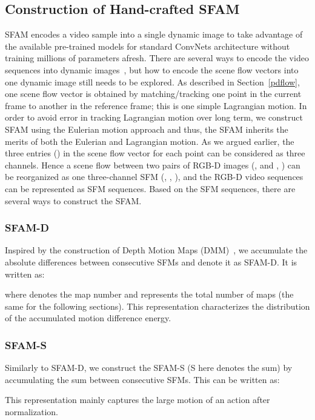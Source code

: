 \documentclass[10pt,twocolumn,letterpaper]{article}
\begin{document}
\subsection{Construction of Hand-crafted SFAM }\label{sfam}
SFAM encodes a video sample into a single dynamic image to 
take advantage of the available pre-trained models for standard ConvNets 
architecture without training millions of parameters afresh. There are several 
ways to encode the video sequences into dynamic 
images~\cite{bobick2001recognition,
man2006individual,
Yang2012a,pichao2015,pichaoTHMS,bilen2016dynamic}, but how to encode 
the scene flow vectors into one dynamic image still needs to be explored. As 
described in Section~\ref{pdflow}, one scene flow vector  is obtained by matching/tracking one point in the 
current frame to another in the reference frame; this is one simple Lagrangian 
motion. In order to avoid error in tracking Lagrangian motion over long term, 
we construct SFAM using the Eulerian motion approach and thus, the SFAM 
inherits the merits of both the Eulerian and Lagrangian motion. As we argued 
earlier, the three entries () in the scene flow vector 
 for each point can be considered as three channels. Hence a
scene flow between two pairs of RGB-D images (,  and , 
) can be reorganized as one three-channel SFM (, 
, ), and the RGB-D video sequences can be represented 
as SFM sequences. Based on the SFM sequences, there are several ways to 
construct the SFAM. 

\subsubsection{SFAM-D}
Inspired by the construction of Depth Motion Maps (DMM)~\cite{Yang2012a}, 
we accumulate the absolute differences between consecutive SFMs and denote it 
as SFAM-D. It is written as:

where  denotes the map number and  represents the total number of maps (the same for the following sections). This representation characterizes the distribution of the accumulated motion difference energy. 

\subsubsection{SFAM-S}
Similarly to SFAM-D, we construct the SFAM-S (S here denotes the sum) by 
accumulating the sum between consecutive SFMs. This can be written as:

This representation mainly captures the large motion of an action after normalization.
\end{document}
